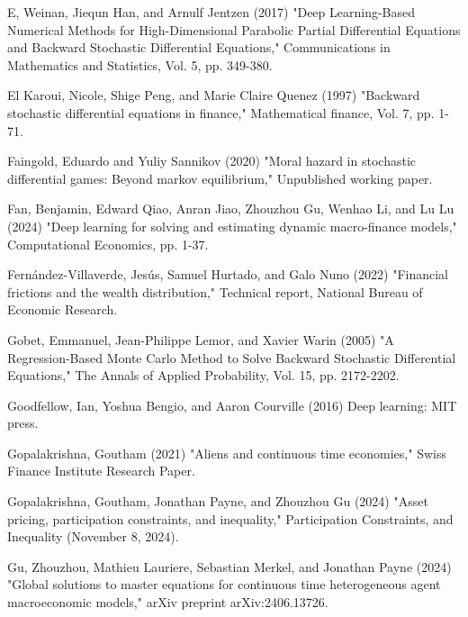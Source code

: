 \documentclass{article}
\begin{document}
\begin{thebibliography}{99}
 E, Weinan, Jiequn Han, and Arnulf Jentzen (2017) "Deep Learning-Based Numerical Methods for High-Dimensional Parabolic Partial Differential Equations and Backward Stochastic Differential Equations," Communications in Mathematics and Statistics, Vol. 5, pp. 349-380.

 El Karoui, Nicole, Shige Peng, and Marie Claire Quenez (1997) "Backward stochastic differential equations in finance," Mathematical finance, Vol. 7, pp. 1-71.

 Faingold, Eduardo and Yuliy Sannikov (2020) "Moral hazard in stochastic differential games: Beyond markov equilibrium," Unpublished working paper.

 Fan, Benjamin, Edward Qiao, Anran Jiao, Zhouzhou Gu, Wenhao Li, and Lu Lu (2024) "Deep learning for solving and estimating dynamic macro-finance models," Computational Economics, pp. 1-37.

 Fernández-Villaverde, Jesús, Samuel Hurtado, and Galo Nuno (2022) "Financial frictions and the wealth distribution," Technical report, National Bureau of Economic Research.

 Gobet, Emmanuel, Jean-Philippe Lemor, and Xavier Warin (2005) "A Regression-Based Monte Carlo Method to Solve Backward Stochastic Differential Equations," The Annals of Applied Probability, Vol. 15, pp. 2172-2202.

 Goodfellow, Ian, Yoshua Bengio, and Aaron Courville (2016) Deep learning: MIT press.

 Gopalakrishna, Goutham (2021) "Aliens and continuous time economies," Swiss Finance Institute Research Paper.

\clearpage

 Gopalakrishna, Goutham, Jonathan Payne, and Zhouzhou Gu (2024) "Asset pricing, participation constraints, and inequality," Participation Constraints, and Inequality (November 8, 2024).

 Gu, Zhouzhou, Mathieu Lauriere, Sebastian Merkel, and Jonathan Payne (2024) "Global solutions to master equations for continuous time heterogeneous agent macroeconomic models," arXiv preprint arXiv:2406.13726.


\end{thebibliography}
\end{document}
